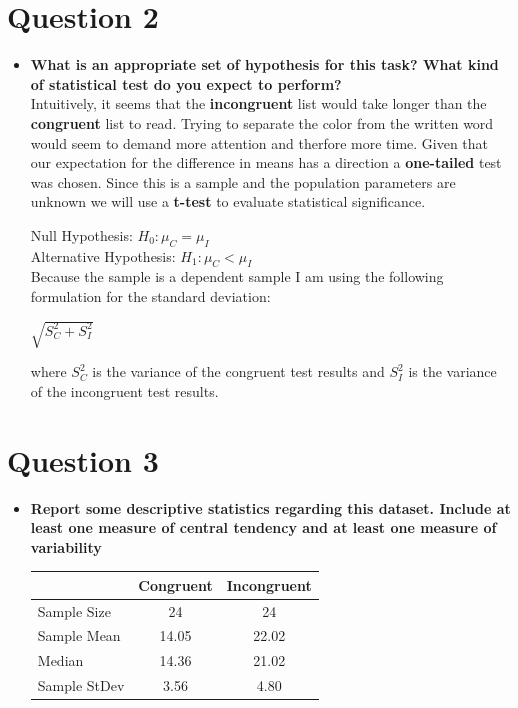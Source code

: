 \documentclass[a4paper,11pt]{report}
\begin{document}
\section{Question 2}
  \begin{itemize}  
    \item \textbf{What is an appropriate set of hypothesis for this task?  What kind of statistical test do you expect to perform?}\\
    Intuitively, it seems that the \textbf{incongruent} list would take longer than the \textbf{congruent} list to read.  Trying to separate the color from the written word would seem to demand more attention and therfore more time.  Given that our expectation for the difference in means has a direction a \textbf{one-tailed} test was chosen.  Since this is a sample and the population parameters are unknown we will use a \textbf{t-test} to evaluate statistical significance.  

    Null Hypothesis: \( H_0: \mu_C = \mu_I \)\\
    Alternative Hypothesis: \( H_1: \mu_C < \mu_I \)\\
    
    Because the sample is a dependent sample I am using the following formulation for the standard deviation: \\
    \begin{center}
      \( \sqrt{S_C^2 + S_I^2} \)\\
    \end{center}
    where \( S_C^2 \) is the variance of the congruent test results and \( S_I^2 \) is the variance of the incongruent test results.\\
  \end{itemize}
  
\section{Question 3}
  \begin{itemize}
    \item \textbf{Report some descriptive statistics regarding this dataset.  Include at least one measure of central tendency and at least one measure of variability}\\
    \begin{center}
      \begin{tabular}{|| l c c ||}
      \hline
      & Congruent & Incongruent \\
      \hline\hline
      Sample Size & 24 & 24 \\
      \hline
      Sample Mean & 14.05 & 22.02 \\
      \hline
      Median & 14.36 & 21.02 \\
      \hline
      Sample StDev & 3.56 & 4.80 \\
      \hline
      \end{tabular}
    \end{center}
  \end{itemize}
  
\end{document}
